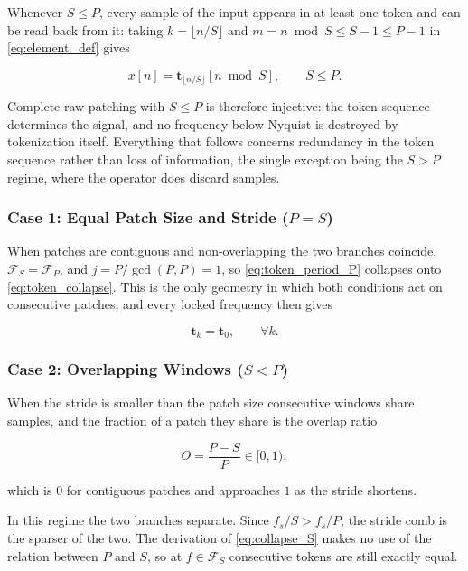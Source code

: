  Whenever $S\le P$, every sample of the input appears in at least one token and can be read back from it: taking $k=\lfloor n/S\rfloor$ and $m = n \bmod S \le S-1 \le P-1$ in \autoref{eq:element_def} gives

\begin{equation}
\label{eq:reconstruction}
x[n]
=
\mathbf{t}_{\lfloor n/S\rfloor}\!\left[n \bmod S\right],
\qquad
S\le P.
\end{equation}

Complete raw patching with $S\le P$ is therefore injective: the token sequence determines the signal, and no frequency below Nyquist is destroyed by tokenization itself. Everything that follows concerns redundancy in the token sequence rather than loss of information, the single exception being the $S>P$ regime, where the operator does discard samples.

\subsubsection{Case 1: Equal Patch Size and Stride ($P=S$)}
When patches are contiguous and non-overlapping the two branches coincide, $\mathcal{F}_{S}=\mathcal{F}_{P}$, and $j=P/\gcd(P,P)=1$, so \autoref{eq:token_period_P} collapses onto \autoref{eq:token_collapse}. This is the only geometry in which both conditions act on consecutive patches, and every locked frequency then gives

\begin{equation}
\mathbf{t}_k
=
\mathbf{t}_0,
\qquad
\forall k.
\end{equation}

\subsubsection{Case 2: Overlapping Windows ($S<P$)}
When the stride is smaller than the patch size consecutive windows share samples, and the fraction of a patch they share is the overlap ratio

\begin{equation}
\label{eq:overlap}
O
=
\frac{P-S}{P}
\in
[0,1),
\end{equation}

which is $0$ for contiguous patches and approaches $1$ as the stride shortens.

In this regime the two branches separate. Since $f_s/S>f_s/P$, the stride comb is the sparser of the two. The derivation of \autoref{eq:collapse_S} makes no use of the relation between $P$ and $S$, so at $f\in\mathcal{F}_{S}$ consecutive tokens are still exactly equal.


